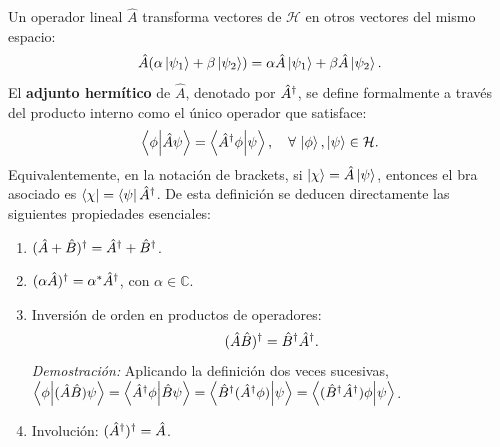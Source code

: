Un operador lineal $\hat{A}$ transforma vectores de $\mathcal{H}$ en otros vectores del mismo espacio:
\begin{equation}
    \hat{A}(\alpha\left| \psi_1 \right\rangle + \beta\left| \psi_2 \right\rangle) = \alpha\hat{A}\left| \psi_1 \right\rangle + \beta\hat{A}\left| \psi_2 \right\rangle.
\end{equation}
El \textbf{adjunto hermítico} de $\hat{A}$, denotado por $\hat{A}^\dagger$, se define formalmente a través del producto interno como el único operador que satisface:
\begin{equation}
    \left\langle \phi \middle| \hat{A}\psi \right\rangle = \left\langle \hat{A}^\dagger\phi \middle| \psi \right\rangle, \quad \forall\,\left| \phi \right\rangle, \left| \psi \right\rangle \in \mathcal{H}.
    \label{eq:def_adjoint}
\end{equation}
Equivalentemente, en la notación de brackets, si $\left| \chi \right\rangle = \hat{A}\left| \psi \right\rangle$, entonces el bra asociado es $\left\langle \chi \right| = \left\langle \psi \right|\hat{A}^\dagger$. De esta definición se deducen directamente las siguientes propiedades esenciales:
\begin{enumerate}
    \item $(\hat{A} + \hat{B})^\dagger = \hat{A}^\dagger + \hat{B}^\dagger$.
    \item $(\alpha\hat{A})^\dagger = \alpha^* \hat{A}^\dagger$, con $\alpha \in \mathbb{C}$.
    \item Inversión de orden en productos de operadores:
    \begin{equation}
        (\hat{A}\hat{B})^\dagger = \hat{B}^\dagger \hat{A}^\dagger.
        \label{eq:adjoint_product}
    \end{equation}
    \textit{Demostración:} Aplicando la definición dos veces sucesivas,
    $\left\langle \phi \middle| (\hat{A}\hat{B})\psi \right\rangle = \left\langle \hat{A}^\dagger\phi \middle| \hat{B}\psi \right\rangle = \left\langle \hat{B}^\dagger(\hat{A}^\dagger\phi) \middle| \psi \right\rangle = \left\langle (\hat{B}^\dagger\hat{A}^\dagger)\phi \middle| \psi \right\rangle$.
    \item Involución: $(\hat{A}^\dagger)^\dagger = \hat{A}$.
\end{enumerate}

